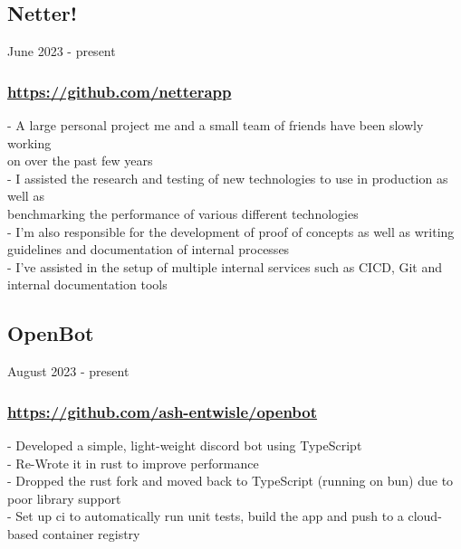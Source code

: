 \subsection{Netter!} June 2023 - present \\
\subsubsection{\href{https://github.com/netterapp}{https://github.com/netterapp}}
-\:  A large personal project me and a small team of friends have been slowly working \\ 
\ind on over the past few years \\
-\:  I assisted the research and testing of new technologies to use in production as well as \\ 
\ind benchmarking the performance of various different technologies \\
-\:  I'm also responsible for the development of proof of concepts as well as writing \\ 
\ind guidelines and documentation of internal processes \\
-\:  I've assisted in the setup of multiple internal services such as CICD, Git and \\
\ind internal documentation tools\\

\subsection{OpenBot} August 2023 - present \\
\subsubsection{\href{https://github.com/ash-entwisle/openbot}{https://github.com/ash-entwisle/openbot}}
-\:  Developed a simple, light-weight discord bot using TypeScript \\
-\:  Re-Wrote it in rust to improve performance \\
-\:  Dropped the rust fork and moved back    to TypeScript (running on bun) due to poor library support \\
-\:  Set up ci to automatically run unit tests, build the app and push to a cloud-based container registry \\

